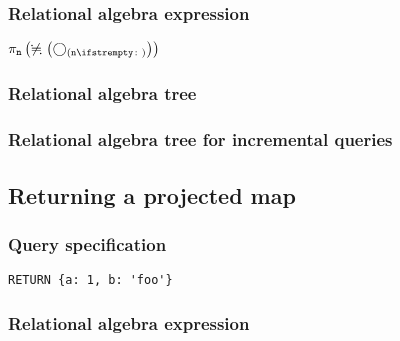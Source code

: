 \subsubsection*{Relational algebra expression}

$\projection{\var{n}} \left(\alldifferent{} \left(\getvertices{n}{}\right)\right)$

\subsubsection*{Relational algebra tree}


\subsubsection*{Relational algebra tree for incremental queries}


\subsection{Returning a projected map}

\subsubsection*{Query specification}

\begin{lstlisting}
RETURN {a: 1, b: 'foo'}
\end{lstlisting}

\subsubsection*{Relational algebra expression}

